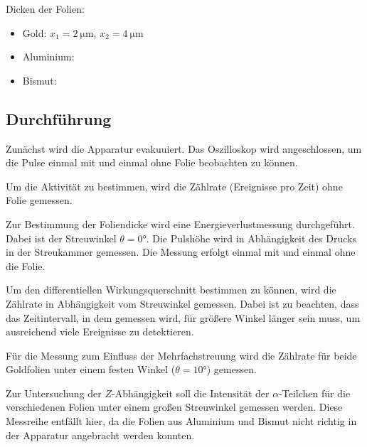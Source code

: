 Dicken der Folien:
\begin{itemize}
  \item Gold: $x_1=\SI{2}{\micro\meter}$, $x_2= \SI{4}{\micro\meter}$
  \item Aluminium:
  \item Bismut:
\end{itemize}


\subsection{Durchführung}
Zunächst wird die Apparatur evakuuiert. Das Oszilloskop wird angeschlossen, um die Pulse einmal mit und einmal ohne Folie beobachten zu können.

Um die Aktivität zu bestimmen, wird die Zählrate (Ereignisse pro Zeit) ohne Folie gemessen.

Zur Bestimmung der Foliendicke wird eine Energieverlustmessung durchgeführt. Dabei ist der Streuwinkel $\theta=0°$. Die Pulshöhe wird in Abhängigkeit des Drucks in der Streukammer gemessen. Die Messung erfolgt einmal mit und einmal ohne die Folie.

Um den differentiellen Wirkungsquerschnitt bestimmen zu können, wird die Zählrate in Abhängigkeit vom Streuwinkel gemessen. Dabei ist zu beachten, dass das Zeitintervall, in dem gemessen wird, für größere Winkel länger sein muss, um ausreichend viele Ereignisse zu detektieren.


Für die Messung zum Einfluss der Mehrfachstreuung wird die Zählrate für beide Goldfolien unter einem festen Winkel ($\theta=10°$) gemessen.

Zur Untersuchung der $Z$-Abhängigkeit soll die Intensität der $\alpha$-Teilchen für die verschiedenen Folien unter einem großen Streuwinkel gemessen werden. Diese Messreihe entfällt hier, da die Folien aus Aluminium und Bismut nicht richtig in der Apparatur angebracht werden konnten.
